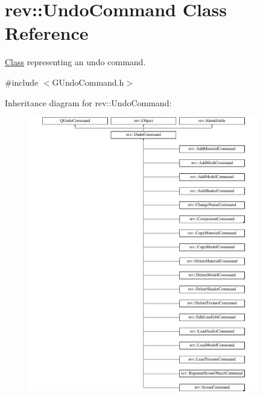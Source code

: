 \hypertarget{classrev_1_1_undo_command}{}\section{rev\+::Undo\+Command Class Reference}
\label{classrev_1_1_undo_command}


\mbox{\hyperlink{struct_class}{Class}} representing an undo command.  




{\ttfamily \#include $<$G\+Undo\+Command.\+h$>$}

Inheritance diagram for rev\+::Undo\+Command\+:\begin{figure}[H]
\begin{center}
\leavevmode
\includegraphics[height=12.000000cm]{classrev_1_1_undo_command}
\end{center}
\end{figure}
